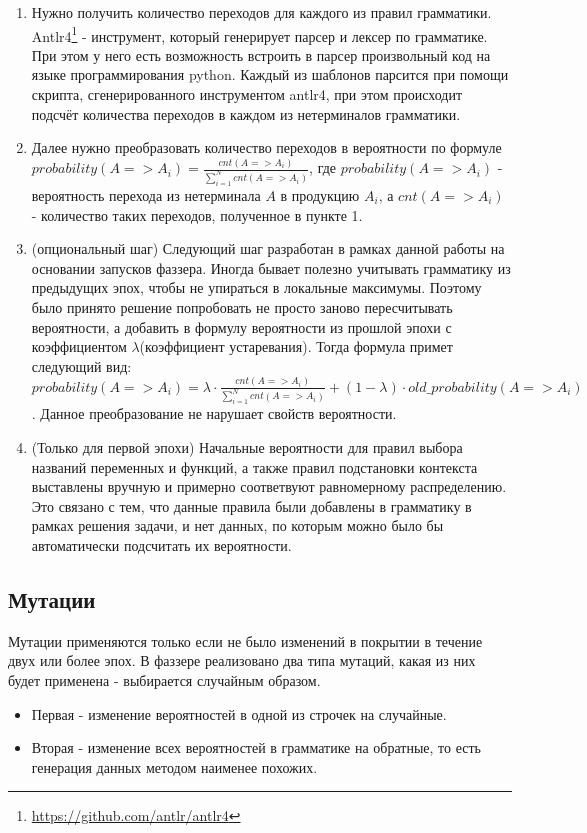 \documentclass[a4paper]{article}
\begin{document}
\begin{enumerate}
    \item Нужно получить количество переходов для каждого из правил грамматики. Antlr4\footnote{\href{https://github.com/antlr/antlr4}{https://github.com/antlr/antlr4}} - инструмент, который генерирует парсер и лексер по грамматике. При этом у него есть возможность встроить в парсер произвольный код на языке программирования python. Каждый из шаблонов парсится при помощи скрипта, сгенерированного инструментом antlr4, при этом происходит подсчёт количества переходов в каждом из нетерминалов грамматики.
    \item Далее нужно преобразовать количество переходов в вероятности по формуле $probability (A => A_i) = \frac{cnt(A => A_i)}{\sum_{i=1}^{N}cnt(A => A_i)}$, где  $probability (A => A_i)$ - вероятность перехода из нетерминала $A$ в продукцию $A_i$, а $cnt(A => A_i)$ - количество таких переходов, полученное в пункте 1.
    \item (опциональный шаг) Следующий шаг разработан в рамках данной работы на основании запусков фаззера. Иногда бывает полезно учитывать грамматику из предыдущих эпох, чтобы не упираться в локальные максимумы. Поэтому было принято решение попробовать не просто заново пересчитывать вероятности, а добавить в формулу вероятности из прошлой эпохи с коэффициентом $\lambda$(коэффициент устаревания). Тогда формула примет следующий вид: $probability (A => A_i) = \lambda \cdot \frac{cnt(A => A_i)}{\sum_{i=1}^{N}cnt(A => A_i)} + (1 - \lambda) \cdot old\_probability (A => A_i)$. Данное преобразование не нарушает свойств вероятности.
    \item (Только для первой эпохи) Начальные вероятности для правил выбора названий переменных и функций, а также правил подстановки контекста выставлены вручную и примерно соответвуют равномерному распределению. Это связано с тем, что данные правила были добавлены в грамматику в рамках решения задачи, и нет данных, по которым можно было бы автоматически подсчитать их вероятности.
\end{enumerate}

\subsection{Мутации}

Мутации применяются только если не было изменений в покрытии в течение двух или более эпох. В фаззере реализовано два типа мутаций, какая из них будет применена - выбирается случайным образом.
\begin{itemize}
    \item Первая - изменение вероятностей в одной из строчек на случайные.
    \item Вторая - изменение всех вероятностей в грамматике на обратные, то есть генерация данных методом наименее похожих.
\end{itemize}
\end{document}
